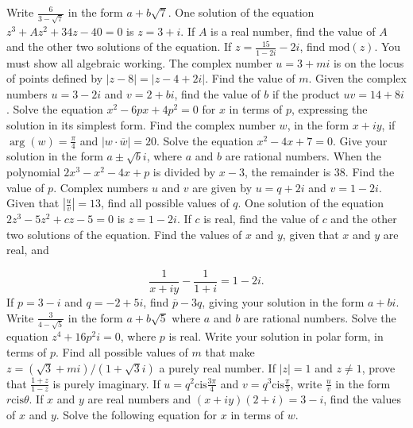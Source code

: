 \documentclass[12pt,addpoints]{exam}
\begin{document}
\begin{questions}
\fillwithlines{3cm}
\question[5] Write \( \frac{6}{3 - \sqrt{7}} \) in the form \( a + b\sqrt{7} \).
\fillwithlines{3cm}
\question[5] One solution of the equation \( z^3 + Az^2 + 34z - 40 = 0 \) is \( z = 3 + i \). If \( A \) is a real number, find the value of \( A \) and the other two solutions of the equation.
\fillwithlines{3cm}
\question[5] If \( z = \frac{15}{1 - 2i} - 2i \), find \(\text{mod}(z)\). You must show all algebraic working.
\fillwithlines{3cm}
\question[5] The complex number \( u = 3 + mi \) is on the locus of points defined by \( |z - 8| = |z - 4 + 2i| \). Find the value of \( m \).
\fillwithlines{3cm}
\question[5] Given the complex numbers \( u = 3 - 2i \) and \( v = 2 + bi \), find the value of \( b \) if the product \( uv = 14 + 8i \).
\fillwithlines{3cm}
\question[5] Solve the equation \( x^2 - 6px + 4p^2 = 0 \) for \( x \) in terms of \( p \), expressing the solution in its simplest form.
\fillwithlines{3cm}
\question[5] Find the complex number \( w \), in the form \( x + iy \), if \(\arg(w) = \frac{\pi}{4}\) and \(|w \cdot \overline{w}| = 20\).
\fillwithlines{3cm}
\question[5] Solve the equation \(x^2 - 4x + 7 = 0\). Give your solution in the form \(a \pm \sqrt{b}i\), where \(a\) and \(b\) are rational numbers.
\fillwithlines{3cm}
\question[5] When the polynomial \(2x^3 - x^2 - 4x + p\) is divided by \(x - 3\), the remainder is 38. Find the value of \(p\).
\fillwithlines{3cm}
\question[5] Complex numbers \(u\) and \(v\) are given by \(u = q + 2i\) and \(v = 1 - 2i\). Given that \(\left| \frac{u}{v} \right| = 13\), find all possible values of \(q\).
\fillwithlines{3cm}
\question[5] One solution of the equation \(2z^3 - 5z^2 + cz - 5 = 0\) is \(z = 1 - 2i\). If \(c\) is real, find the value of \(c\) and the other two solutions of the equation.
\fillwithlines{3cm}
\question[5] Find the values of \( x \) and \( y \), given that \( x \) and \( y \) are real, and

\[
\frac{1}{x + iy} - \frac{1}{1 + i} = 1 - 2i.
\]
\fillwithlines{3cm}
\question[5] If \( p = 3 - i \) and \( q = -2 + 5i \), find \( \overline{p} - 3q \), giving your solution in the form \( a + bi \).
\fillwithlines{3cm}
\question[5] Write \( \frac{3}{4 - \sqrt{5}} \) in the form \( a + b\sqrt{5} \) where \( a \) and \( b \) are rational numbers.
\fillwithlines{3cm}
\question[5] Solve the equation \( z^4 + 16p^2i = 0 \), where \( p \) is real. Write your solution in polar form, in terms of \( p \).
\fillwithlines{3cm}
\question[5] Find all possible values of \( m \) that make \( z = (\sqrt{3} + mi) / (1 + \sqrt{3}i) \) a purely real number.
\fillwithlines{3cm}
\question[5] If \( |z| = 1 \) and \( z \neq 1 \), prove that \(\frac{1+z}{1-z}\) is purely imaginary.
\fillwithlines{3cm}
\question[5] If \( u = q^2 \text{cis} \frac{3\pi}{4} \) and \( v = q^3 \text{cis} \frac{\pi}{3} \), write \( \frac{u}{v} \) in the form \( r \text{cis} \theta \).
\fillwithlines{3cm}
\question[5] If \( x \) and \( y \) are real numbers and \( (x + iy)(2 + i) = 3 - i \), find the values of \( x \) and \( y \).
\fillwithlines{3cm}
\question[5] Solve the following equation for \( x \) in terms of \( w \).


\end{questions}
\end{document}
